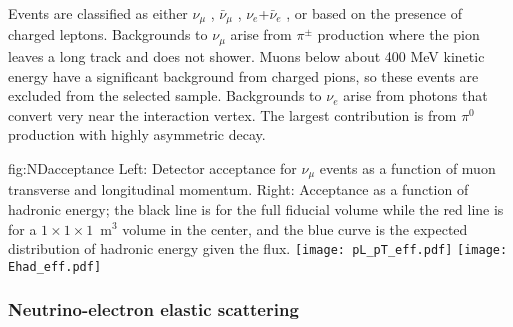 
Events are classified as either $\nu_{\mu}$ , $\bar{\nu}_{\mu}$ , $\nu_{e}$+$\bar{\nu}_{e}$ , or  based on the presence of charged leptons. Backgrounds to $\nu_{\mu}$  arise from  $\pi^{\pm}$ production where the pion leaves a long track and does not shower. Muons below about 400 MeV kinetic energy have a significant background from charged pions, so these  events are excluded from the selected sample. Backgrounds to $\nu_{e}$  arise from photons that convert very near the interaction vertex. The largest contribution is from $\pi^{0}$ production with highly asymmetric decay.

\begin{dunefigure}[ND acceptance]{fig:NDacceptance}
{Left: Detector acceptance for $\nu_{\mu}$  events as a function of muon transverse and longitudinal momentum. Right: Acceptance as a function of hadronic energy; the black line is for the full fiducial volume while the red line is for a $1 \times 1 \times 1$~m$^{3}$ volume in the center, and the blue curve is the expected distribution of hadronic energy given the  flux.}
 \texttt{[image: pL\_pT\_eff.pdf]}
 \texttt{[image: Ehad\_eff.pdf]}
\end{dunefigure}

\subsubsection{Neutrino-electron elastic scattering}



